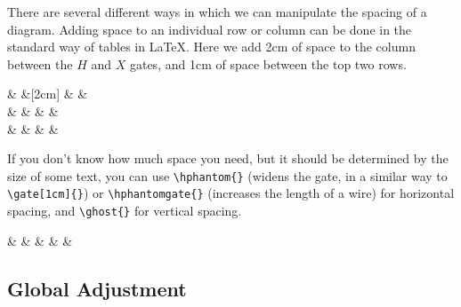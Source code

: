 \documentclass[aps,pra,10pt,nofootinbib]{revtex4-2}
\begin{document}
There are several different ways in which we can manipulate the spacing of a diagram. Adding space to an individual row or column can be done in the standard way of tables in LaTeX. Here we add 2cm of space to the column between the $H$ and $X$ gates, and 1cm of space between the top two rows.
\begin{Code}
\begin{quantikz}
&  &[2cm]  &  & \\[1cm]
&  &  &  &\\
&  &  &  &
\end{quantikz}
\end{Code}
If you don't know how much space you need, but it should be determined by the size of some text, you can use \verb!\hphantom{}! (widens the gate, in a similar way to \verb!\gate[1cm]{}!) or \verb!\hphantomgate{}! (increases the length of a wire) for horizontal spacing, and \verb!\ghost{}! for vertical spacing.
\begin{Code}
\begin{quantikz}
&  \hphantom{very wide} &  &  &  &
\end{quantikz}
\end{Code} 

\subsection{Global Adjustment}
\end{document}

